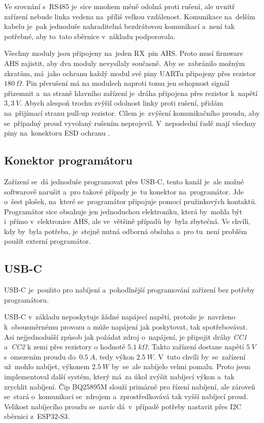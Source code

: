 Ve srovnání s~RS485 je~sice mnohem méně odolná proti rušení, ale uvnitř zařízení nebude linka vedena na~příliš velkou vzdálenost.
Komunikace na~delším kabelu je~pak jednoduše nahraditelná bezdrátovou komunikací a~není tak potřebné, aby to~tato sběrnice v~základu podporovala.

Všechny moduly jsou připojeny na~jeden RX~pin AHS.
Proto musí firmware AHS zajistit, aby dva moduly nevysílaly současně.
Aby se~zabránilo možným zkratům, má~jako ochranu každý modul své piny UARTu připojeny přes rezistor \(180~\Omega\).
Pin přerušení má na modulech naproti tomu jen schopnost signál přizemnit a~na straně hlavního zařízení je~dráha připojena přes rezistor k~napětí \(3,3~V\).
Abych alespoň trochu zvýšil odolnost linky proti rušení, přidám na~přijímací stranu pull-up rezistor.
Cílem je~zvýšení komunikačního proudu, aby se~případný proud vyvolaný rušením neprojevil.
V~neposlední řadě mají všechny piny na~konektoru ESD ochranu \cite{TPD4E02B04}.

\subsection{Konektor programátoru}
Zařízení se~dá jednoduše programovat přes USB-C, tento kanál je~ale možné softwarově narušit a~pro takové případy je~tu konektor na~programátor.
Jde o~šest plošek, na~které se~programátor připojuje pomocí pružinkových kontaktů.
Programátor sice obsahuje jen jednoduchou elektroniku, která by~mohla být i~přímo v~elektronice AHS, ale ve~většině případů by~byla zbytečná.
Ve chvíli, kdy by~byla potřeba, je~stejně nutná odborná obsluha a~pro tu~není problém použít externí programátor.

\subsection{USB-C}
USB-C je~použito pro nabíjení a~pohodlnější programování zařízení bez potřeby programátoru.

USB-C v~základu neposkytuje žádné napájecí napětí, protože je~navrženo k~obousměrnému provozu a může napájení jak poskytovat, tak spotřebovávat.
Asi nejjednodušší způsob jak požádat zdroj o~napájení, je připojit dráhy {\it CC1} a~{\it CC2} k zemi přes rezistory o hodnotě \(5.1~k\Omega\).
Takto zařízení dostane napětí \(5~V\) s~omezením proudu do~\(0.5~A\), tedy výkon \(2.5~W\).
V~tuto chvíli by~se~zařízení už~mohlo nabíjet, výkonem \(2.5~W\) by~se~ale nabíjelo velmi pomalu.
Proto jsem implementoval další systém, který má~za úkol zvýšit nabíjecí výkon a~tak zrychlit nabíjení.
Čip BQ25895M \cite{BQ25895} slouží primárně pro řízení nabíjení, ale zároveň se~stará o~komunikaci se~zdrojem a~zprostředkovává tak vyšší nabíjecí proud.
Velikost nabíjecího proudu se~navíc dá~v~případě potřeby nastavit přes I2C sběrnici z~ESP32-S3.

